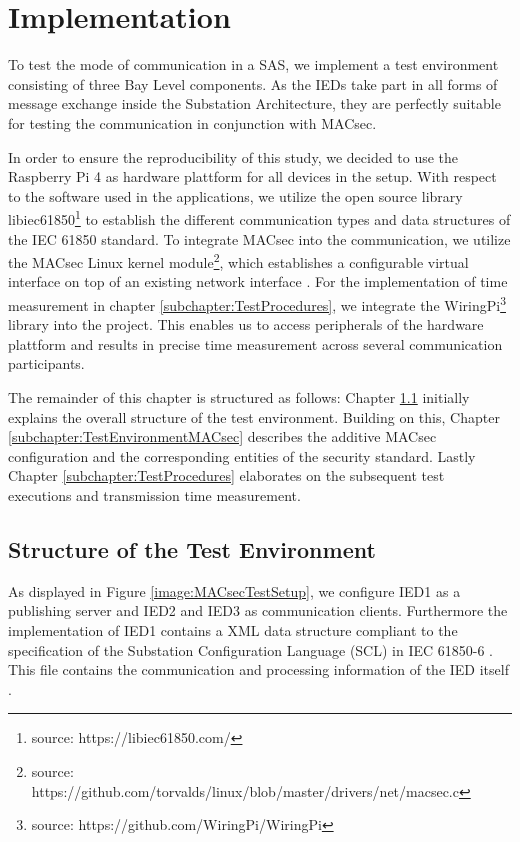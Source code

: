 \documentclass[conference, onecolumn, a4paper]{IEEEtran}
\begin{document}
\section{Implementation}
\label{chapter:implementation}
\noindent To test the mode of communication in a SAS, we implement a test environment consisting of three Bay Level components. As the IEDs take part 
in all forms of message exchange inside the Substation Architecture, they are perfectly suitable for testing the communication in conjunction with MACsec. 

\smallskip
In order to ensure the reproducibility of this study, we decided to use the Raspberry Pi 4 as hardware plattform for all devices in the setup. With respect 
to the software used in the applications, we utilize the open source library libiec61850\footnote{source: https://libiec61850.com/} to establish the 
different communication types and data structures of the IEC 61850 standard. To integrate MACsec into the communication, we utilize the MACsec Linux kernel 
module\footnote{source: https://github.com/torvalds/linux/blob/master/drivers/net/macsec.c}, which establishes a configurable virtual interface on top of 
an existing network interface \cite{MACsecLinuxModuleDoc:2016}. For the implementation of time measurement in chapter \ref{subchapter:TestProcedures},  
we integrate the WiringPi\footnote{source: https://github.com/WiringPi/WiringPi} library into the project. This enables us to access peripherals of the 
hardware plattform and results in precise time measurement across several communication participants. 

\smallskip 
The remainder of this chapter is structured as follows: Chapter \ref{subchapter:TestEnvironmentStructure} initially explains the overall structure of the 
test environment. Building on this, Chapter \ref{subchapter:TestEnvironmentMACsec} describes the additive MACsec configuration and the corresponding entities 
of the security standard. Lastly Chapter \ref{subchapter:TestProcedures} elaborates on the subsequent test executions and transmission time measurement. 

\subsection{Structure of the Test Environment}
\label{subchapter:TestEnvironmentStructure}
\noindent As displayed in Figure \ref{image:MACsecTestSetup}, we configure IED1 as a publishing server and IED2 and IED3 as communication clients. 
Furthermore the implementation of IED1 contains a XML data structure compliant to the specification of the Substation Configuration Language (SCL) 
in IEC 61850-6 \cite{IEC61850-6:2010}. This file contains the communication and processing information of the IED itself \cite{IEC61850_Overview:2006}.
\end{document}
